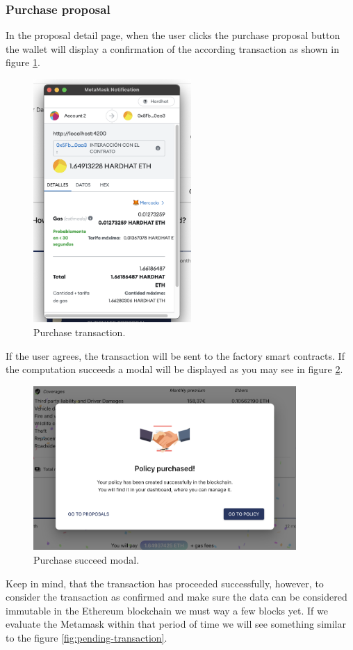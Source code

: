 \subsubsection{Purchase proposal}
\label{section:purchase-proposal}
{
In the proposal detail page, when the user clicks the purchase proposal button the wallet will display a confirmation of the according transaction as shown in figure \ref{fig:purchase-transaction}.

\begin{figure}[H]
\centering
\includegraphics[width=6cm]{img/results/purchase-transaction.png}
\caption[Insurechain: Purchase transaction]{\footnotesize{Purchase transaction.}}
\label{fig:purchase-transaction}
\end{figure}


If the user agrees, the transaction will be sent to the factory smart contracts. If the computation succeeds a modal will be displayed as you may see in figure \ref{fig:purchase-succeed-modal}. 

\begin{figure}[H]
\centering
\includegraphics[width=10cm]{img/results/purchase-succeed-modal.png}
\caption[Insurechain: Purchase succeed modal]{\footnotesize{Purchase succeed modal.}}
\label{fig:purchase-succeed-modal}
\end{figure}
Keep in mind, that the transaction has proceeded successfully, however, to consider the transaction as confirmed and make sure the data can be considered immutable in the Ethereum blockchain we must way a few blocks yet. If we evaluate the Metamask within that period of time we will see something similar to the figure \ref{fig:pending-transaction}.

}
